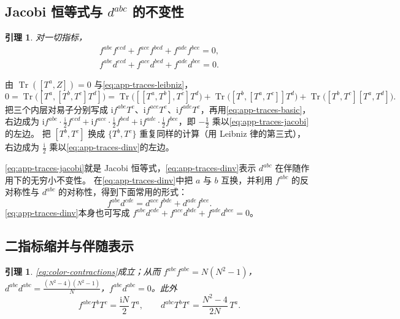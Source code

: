 \documentclass[UTF8,a4paper,11pt,fontset=fandol]{ctexart}
\makeatletter
\theoremstyle{cplain}
\newtheorem{lemma}[theorem]{引理}
\theoremstyle{cdefinition}
\theoremstyle{cremark}
\renewcommand{\proofname}{证明}
\renewenvironment{proof}[1][\proofname]{\par\pushQED{\qed}\normalfont\topsep6\p@\@plus6\p@\relax
  \trivlist\item[\hskip\labelsep\itshape #1\hspace{0.5em}]\ignorespaces}{\popQED\endtrivlist\@endpefalse}
\numberwithin{equation}{section}
\DeclareMathOperator{\Tr}{Tr}
\newcommand{\ii}{\mathrm{i}}                        %
\makeatother
\begin{document}
\subsection{Jacobi 恒等式与 \texorpdfstring{$d^{abc}$}{dᵃᵇᶜ} 的不变性}\label{sec:app-traces-jacobi}

\begin{lemma}\label{lem:app-traces-jacobi}
对一切指标，
\begin{gather}
f^{abe}f^{ecd}+f^{ace}f^{bed}+f^{ade}f^{bce}=0,\label{eq:app-traces-jacobi}\\
f^{abe}d^{ecd}+f^{ace}d^{bed}+f^{ade}d^{bce}=0 .\label{eq:app-traces-dinv}
\end{gather}
\end{lemma}

\begin{proof}
由 $\Tr([T^a,Z])=0$ 与\cref{eq:app-traces-leibniz}，
\[
0=\Tr\bigl([T^a,[T^b,T^c]T^d]\bigr)=\Tr\bigl([[T^a,T^b],T^c]T^d\bigr)+\Tr\bigl([T^b,[T^a,T^c]]T^d\bigr)+\Tr\bigl([T^b,T^c][T^a,T^d]\bigr).
\]
把三个内层对易子分别写成 $\ii f^{abe}T^e$、$\ii f^{ace}T^e$、$\ii f^{ade}T^e$，再用\cref{eq:app-traces-basic}，右边成为
$\ii f^{abe}\cdot\frac{\ii}2f^{ecd}+\ii f^{ace}\cdot\frac{\ii}2f^{bed}+\ii f^{ade}\cdot\frac{\ii}{2}f^{bce}$，即 $-\frac12$ 乘以\cref{eq:app-traces-jacobi}的左边。
把 $[T^b,T^c]$ 换成 $\{T^b,T^c\}$ 重复同样的计算（用 Leibniz 律的第三式），右边成为 $\frac{\ii}2$ 乘以\cref{eq:app-traces-dinv}的左边。
\end{proof}

\cref{eq:app-traces-jacobi}就是 Jacobi 恒等式，\cref{eq:app-traces-dinv}表示 $d^{abc}$ 在伴随作用下的无穷小不变性。
在\cref{eq:app-traces-dinv}中把 $a$ 与 $b$ 互换，并利用 $f^{abc}$ 的反对称性与 $d^{abc}$ 的对称性，得到下面常用的形式：
\begin{equation}\label{eq:app-traces-fd-relation}
f^{abe}d^{cde}=d^{ace}f^{bde}+d^{ade}f^{bce}.
\end{equation}
\cref{eq:app-traces-dinv}本身也可写成 $f^{abe}d^{cde}+f^{ace}d^{bde}+f^{ade}d^{bce}=0$。

\subsection{二指标缩并与伴随表示}\label{sec:app-traces-two}

\begin{lemma}\label{lem:app-traces-contractions}
\cref{eq:color-contractions}成立；从而 $f^{abc}f^{abc}=N(N^2-1)$，$d^{abc}d^{abc}=\frac{(N^2-4)(N^2-1)}{N}$，$f^{abc}d^{abc}=0$。此外
\begin{equation}\label{eq:app-traces-fTT}
f^{abc}T^bT^c=\frac{\ii N}{2}\,T^a,\qquad d^{abc}T^bT^c=\frac{N^2-4}{2N}\,T^a .
\end{equation}
\end{lemma}
\end{document}
